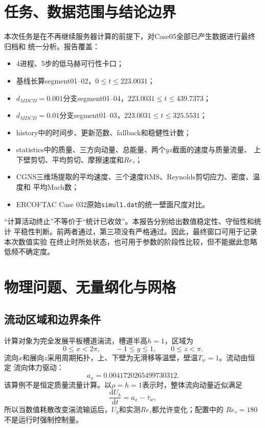 \documentclass[UTF8,12pt,a4paper,fontset=fandol]{ctexart}
\newcommand{\Retau}{Re_{\tau}}
\newcommand{\Ub}{U_b}
\newcommand{\code}[1]{\texttt{#1}}
\begin{document}
\tableofcontents
\clearpage

\section{任务、数据范围与结论边界}

本次任务是在不再继续服务器计算的前提下，对Case05全部已产生数据进行最终归档和
统一分析。报告覆盖：

\begin{itemize}
  \item 4进程、5步的低马赫可行性卡口；
  \item 基线长算segment01--02，$0\le t\le223.0031$；
  \item $d_{MDCD}=0.001$分支segment01--04，$223.0031\le t\le439.7373$；
  \item $d_{MDCD}=0.01$分支segment01--03，$223.0031\le t\le325.5531$；
  \item history中的时间步、更新范数、fallback和稳健性计数；
  \item statistics中的质量、三方向动量、总能量、两个$yz$截面的速度与质量流量、
        上下壁剪切、平均剪切、摩擦速度和$\Retau$；
  \item CGNS三维场提取的平均速度、三个速度RMS、Reynolds剪切应力、密度、温度和
        平均Mach数；
  \item ERCOFTAC Case 032原始\code{simul1.dat}的统一壁面尺度对比。
\end{itemize}

“计算活动终止”不等价于“统计已收敛”。本报告分别给出数值稳定性、守恒性和统计
平稳性判断。前两者通过，第三项没有严格通过。因此，最终窗口可用于记录本次数值实验
在终止时所处状态，也可用于参数的阶段性比较，但不能据此忽略低频不确定度。

\section{物理问题、无量纲化与网格}

\subsection{流动区域和边界条件}

计算对象为完全发展平板槽道湍流，槽道半高$h=1$，区域为
\begin{equation}
  0\le x<2\pi,\qquad -1\le y\le1,\qquad 0\le z<\pi .
\end{equation}
流向$x$和展向$z$采用周期拓扑，上、下壁为无滑移等温壁，壁温$T_w=1$。流动由恒定
流向体力驱动：
\begin{equation}
  a_x=0.0041720265499730312 .
\end{equation}
该算例不是恒定质量流量计算。以$\rho=h=1$表示时，整体流向动量近似满足
\begin{equation}
  \frac{\mathrm d\Ub}{\mathrm dt}=a_x-\overline{\tau}_w,
  \label{eq:momentum-balance}
\end{equation}
所以当数值耗散改变湍流输运后，$\Ub$和实测$\Retau$都允许变化；配置中的
$\Retau=180$不是运行时强制控制量。
\end{document}

